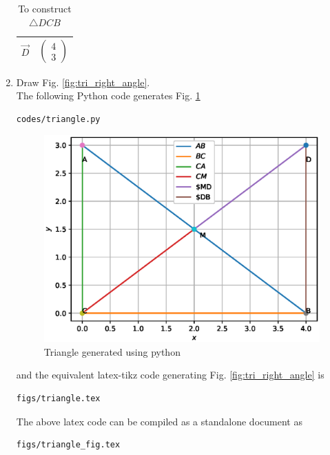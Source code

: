 \begin{enumerate}[label=\thesection.\arabic*.,ref=\thesection.\theenumi]
\begin{table}[ht!]
\begin{tabular}{ |p{3cm}|p{3cm}|  }
\hline
$\vec{D}$ & $$\begin{pmatrix}4\\3\end{pmatrix} $$\\
\hline
\end{tabular}
\caption{To construct $\triangle DCB$}
\label{table:table2}
\end{table}
%
\item Draw Fig. \ref{fig:tri_right_angle}.	
\\
\solution The  following Python code generates Fig. \ref{fig:tri_sss_py}
%
\begin{lstlisting}
codes/triangle.py
\end{lstlisting}
\begin{figure}[!ht]
\centering
\includegraphics[width=\columnwidth]{./figs/triangle.eps}
\caption{Triangle generated using python}
\label{fig:tri_sss_py}
\end{figure}

%
and the equivalent latex-tikz code generating Fig. \ref{fig:tri_right_angle} is 
\begin{lstlisting}
figs/triangle.tex
\end{lstlisting}
%
The above latex code can be compiled as a standalone document as
\begin{lstlisting}
figs/triangle_fig.tex
\end{lstlisting}

%

%

%
%

\end{enumerate}

